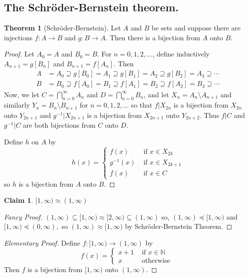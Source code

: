 \documentclass{article}
\newcommand{\N}{\mathbb{N}}
\theoremstyle{definition}
\newtheorem{theorem}{Theorem}
\newtheorem*{claim}{Claim}
\begin{document}
\subsection*{The Schr\"{o}der-Bernstein theorem.}

\begin{theorem}[Schr\"{o}der-Bernstein]
    Let $A$ and $B$ be sets and suppose there are injections $f: A \rightarrow B$ and $g: B \rightarrow A$. Then there is a bijection from $A$ onto $B$.
\end{theorem}
\begin{proof}
    Let $A_0 = A$ and $B_0 = B$. For $n = 0, 1, 2, \ldots$, define inductively $A_{n+1} = g[B_n]$ and $B_{n+1} = f[A_n]$. Then
    \begin{align*}
        A &= A_0 \supseteq g[B_0] = A_1 \supseteq g[B_1] = A_2 \supseteq g[B_2] = A_3 \supseteq \cdots \\
        B &= B_0 \supseteq f[A_0] = B_1 \supseteq f[A_1] = B_2 \supseteq f[A_2] = B_3 \supseteq \cdots
    \end{align*}
    Now, we let $C = \bigcap_{n=0}^\infty A_n$ and $D = \bigcap_{n=0}^\infty B_n$, and let
    $X_n = A_n \setminus A_{n+1}$ and similarly $Y_n = B_n \setminus B_{n+1}$ for $n = 0, 1, 2, \ldots$
    so that $f|X_{2n}$ is a bijection from $X_{2n}$ onto $Y_{2n+1}$ and $g^{-1}|X_{2n+1}$ is a bijection from $X_{2n+1}$ onto $Y_{2n+2}$. Thus $f|C$ and $g^{-1}|C$ are both bijections from $C$ onto $D$.
    
    Define $h$ on $A$ by
    \[
        h(x) = \begin{cases}
            f(x) & \text{ if } x \in X_{2k} \\
            g^{-1}(x) & \text{ if } x \in X_{2k+1} \\
            f(x) & \text{ if } x \in C
        \end{cases}
    \]
    so $h$ is a bijection from $A$ onto $B$.
\end{proof}

\begin{claim}
    $[1,\infty) \approx (1,\infty)$
\end{claim}
\begin{proof}[Fancy Proof]
    $(1,\infty) \subseteq [1,\infty) \approx [2,\infty) \subseteq (1,\infty)$ so, $(1,\infty) \preceq [1,\infty)$ and $[1,\infty) \preceq (0,\infty),$ so $(1,\infty) \approx [1,\infty)$ by Schr\"{o}der-Bernstein Theorem.
\end{proof}
\begin{proof}[Elementary Proof]
    Define $f: [1,\infty) \rightarrow (1,\infty)$ by 
    \[
        f(x) = \begin{cases}
            x+1 & \text{ if } x \in \N \\
            x & \text{ otherwise }
        \end{cases}
    \]
    Then $f$ is a bijection from $[1,\infty)$ onto $(1,\infty)$.
\end{proof}
\end{document}
